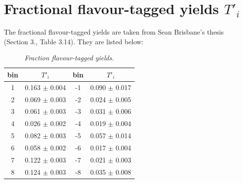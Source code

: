 \section{Fractional flavour-tagged \KlPiPi yields $T'_i$}
The fractional flavour-tagged \KlPiPi yields are taken from Sean Brisbane's thesis (Section 3., Table 3.14). They are listed below:
\begin{table}[!h]
	\begin{center}
		\begin{tabular}{c| c | c |c }
			bin & $T'_i$ & bin & $T'_i$ \\
			\hline
1 & 0.163 $ \pm $ 0.004 \qquad & -1 & 0.090 $ \pm $ 0.017 \\ 
2 & 0.069 $ \pm $ 0.003 \qquad & -2 & 0.024 $ \pm $ 0.005 \\ 
3 & 0.061 $ \pm $ 0.003 \qquad & -3 & 0.031 $ \pm $ 0.006 \\ 
4 & 0.026 $ \pm $ 0.002 \qquad & -4 & 0.019 $ \pm $ 0.004 \\ 
5 & 0.082 $ \pm $ 0.003 \qquad & -5 & 0.057 $ \pm $ 0.014 \\ 
6 & 0.058 $ \pm $ 0.002 \qquad & -6 & 0.017 $ \pm $ 0.004 \\ 
7 & 0.122 $ \pm $ 0.003 \qquad & -7 & 0.021 $ \pm $ 0.003 \\ 
8 & 0.124 $ \pm $ 0.003 \qquad & -8 & 0.035 $ \pm $ 0.008 \\ 


\end{tabular}
\end{center}
\caption{\textit{Fraction flavour-tagged \KlPiPi yields.}}
\end{table} 


